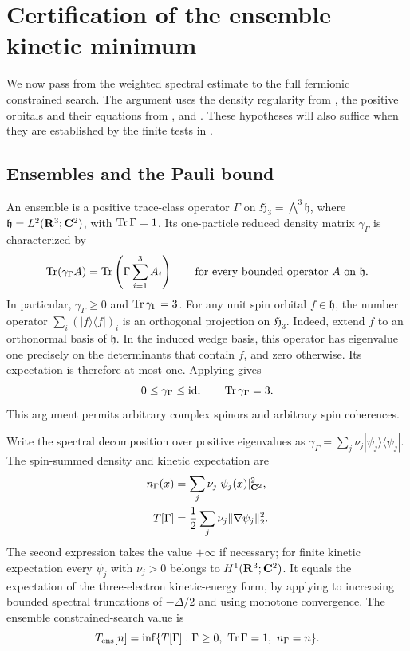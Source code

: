 \section{Certification of the ensemble kinetic minimum}
\label{sec:ensemble}

We now pass from the weighted spectral estimate to the full fermionic
constrained search.  The argument uses the density regularity from
, the positive orbitals and their equations from
, and .  These hypotheses
will also suffice when they are established by the finite tests in
.

\subsection{Ensembles and the Pauli bound}

An ensemble is a positive trace-class operator $\Gamma$ on
$\mathfrak H_3=\bigwedge^3\mathfrak h$, where
$\mathfrak h=L^2(\mathbf R^3;\mathbf C^2)$, with $\operatorname{Tr}\Gamma=1$.  Its one-particle
reduced density matrix $\gamma_\Gamma$ is characterized by
\begin{equation}
 \operatorname{Tr}(\gamma_\Gamma A)
 =\operatorname{Tr}\left(\Gamma\sum_{i=1}^3 A_i\right)
 \qquad\text{for every bounded operator $A$ on $\mathfrak h$}.
 \label{eq:ensemble-rdm}
\end{equation}
In particular, $\gamma_\Gamma\ge0$ and $\operatorname{Tr}\gamma_\Gamma=3$.
For any unit spin orbital $f\in\mathfrak h$, the number operator
$\sum_i(|f\rangle\langle f|)_i$ is an orthogonal projection on
$\mathfrak H_3$.  Indeed, extend $f$ to an orthonormal basis of
$\mathfrak h$.  In the induced wedge basis, this operator has eigenvalue
one precisely on the determinants that contain $f$, and zero otherwise.
Its expectation is therefore at most one.  Applying
 gives
\begin{equation}
 0\le\gamma_\Gamma\le\operatorname{id},
 \qquad \operatorname{Tr}\gamma_\Gamma=3.
 \label{eq:ensemble-pauli}
\end{equation}
This argument permits arbitrary complex spinors and arbitrary spin
coherences.

Write the spectral decomposition over positive eigenvalues as
$\gamma_\Gamma=\sum_j\nu_j|\psi_j\rangle\langle\psi_j|$.
The spin-summed density and kinetic expectation are
\begin{align}
 n_\Gamma(x)
 &=\sum_j\nu_j|\psi_j(x)|_{\mathbf C^2}^2,
 \label{eq:ensemble-density}\\
 T[\Gamma]
 &=\frac12\sum_j\nu_j\|\nabla\psi_j\|_2^2.
 \label{eq:ensemble-kinetic}
\end{align}
The second expression takes the value $+\infty$ if necessary; for finite
kinetic expectation every $\psi_j$ with $\nu_j>0$ belongs to
$H^1(\mathbf R^3;\mathbf C^2)$.  It equals the expectation of the three-electron
kinetic-energy form, by applying  to increasing
bounded spectral truncations of $-\Delta/2$ and using monotone
convergence.  The ensemble constrained-search value is
\begin{equation}
 T_{\mathrm{ens}}[n]
 =\inf\{T[\Gamma]:\Gamma\ge0,\ \operatorname{Tr}\Gamma=1,\ n_\Gamma=n\}.
 \label{eq:ensemble-search}
\end{equation}

